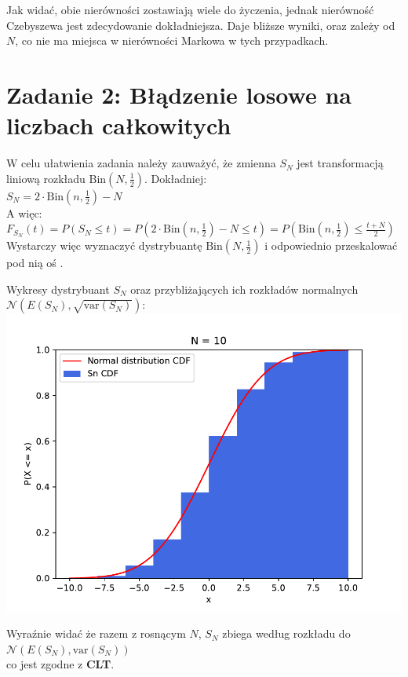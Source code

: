 \documentclass{article}
\begin{document}
Jak widać, obie nierówności zostawiają wiele do życzenia, jednak nierówność Czebyszewa jest zdecydowanie dokładniejsza.
Daje bliższe wyniki, oraz zależy od \( N \), co nie ma miejsca w nierówności Markowa w tych przypadkach.\\

\section*{Zadanie 2: Błądzenie losowe na liczbach całkowitych}

W celu ułatwienia zadania należy zauważyć, że zmienna \( S_N \) jest transformacją liniową rozkładu \( \text{Bin}\left(N, \frac{1}{2}\right) \).
Dokładniej: \\
\( S_N = 2 \cdot \text{Bin}\left(n, \frac{1}{2}\right) - N \)\\
A więc: \\
\( F_{S_N}\left(t\right) = P\left(S_N \leq t\right) = P\left(2 \cdot \text{Bin}\left(n, \frac{1}{2}\right) - N \leq t\right) = P\left(\text{Bin}\left(n, \frac{1}{2}\right) \leq \frac{t + N}{2}\right) \)\\
Wystarczy więc wyznaczyć dystrybuantę \( \text{Bin}\left(N, \frac{1}{2}\right) \) i odpowiednio przeskalować pod nią oś .

Wykresy dystrybuant \( S_N \) oraz przybliżających ich rozkładów normalnych \( \mathcal{N}\left(E\left(S_N\right), \sqrt{\text{var}\left(S_N\right)}\right) \):
\hspace*{-0cm} \includegraphics[scale=0.5]{./plots/exc2.pdf}

Wyraźnie widać że razem z rosnącym \( N \), \( S_N \) zbiega według rozkładu do \( \mathcal{N}\left(E\left(S_N\right), \text{var}\left(S_N\right)\right) \)\\
co jest zgodne z \textbf{CLT}. \\
\end{document}
